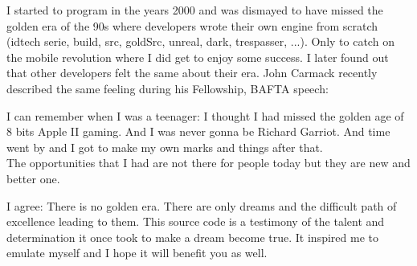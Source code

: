 \documentclass[book.tex]{subfiles}
\begin{document}
I started to program in the years 2000 and was dismayed to have missed the golden era of the 90s where developers wrote their own engine from scratch (idtech serie, build, src, goldSrc, unreal, dark, trespasser, ...). Only to catch on the mobile revolution where I did get to enjoy some success. I later found out that other developers felt the same about their era. John Carmack recently described the same feeling during his Fellowship, BAFTA speech:\\

 \begin{fancyquotes}
I can remember when I was a teenager: I thought I had missed the golden age of 8 bits Apple II gaming. And I was never gonna be Richard Garriot. And time went by and I got to make
    my own marks and things after that.\\
    
    The opportunities that I had are not there for people today but they are new and better one.
 \bigskip
 \end{fancyquotes}


    
\bigskip
    I agree: There is no golden era. There are only dreams and the difficult path of excellence leading to them. This source code is a testimony of the talent and determination it once took to make a dream become true. It inspired me to emulate myself and I hope it will benefit you as well.

\bigskip


  
\end{document}
